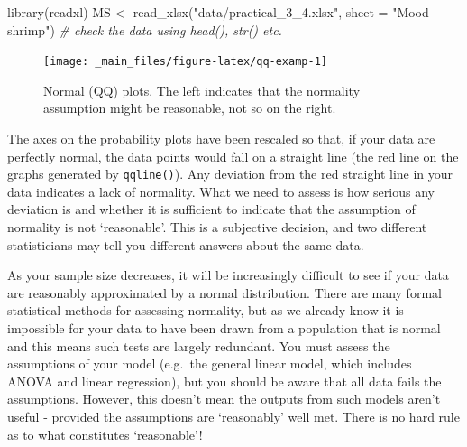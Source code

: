 \documentclass[
  11pt,
  a4paper,
]{book}
\newenvironment{Shaded}{\begin{snugshade}}{\end{snugshade}}
\newcommand{\AttributeTok}[1]{\textcolor[rgb]{0.77,0.63,0.00}{#1}}
\newcommand{\CommentTok}[1]{\textcolor[rgb]{0.56,0.35,0.01}{\textit{#1}}}
\newcommand{\DecValTok}[1]{\textcolor[rgb]{0.00,0.00,0.81}{#1}}
\newcommand{\FunctionTok}[1]{\textcolor[rgb]{0.00,0.00,0.00}{#1}}
\newcommand{\NormalTok}[1]{#1}
\newcommand{\OtherTok}[1]{\textcolor[rgb]{0.56,0.35,0.01}{#1}}
\newcommand{\SpecialCharTok}[1]{\textcolor[rgb]{0.00,0.00,0.00}{#1}}
\newcommand{\StringTok}[1]{\textcolor[rgb]{0.31,0.60,0.02}{#1}}
\begin{document}
\begin{Shaded}
\begin{Highlighting}[]
\FunctionTok{library}\NormalTok{(readxl) }
\NormalTok{MS }\OtherTok{\textless{}{-}} \FunctionTok{read\_xlsx}\NormalTok{(}\StringTok{"data/practical\_3\_4.xlsx"}\NormalTok{, }\AttributeTok{sheet =} \StringTok{"Mood shrimp"}\NormalTok{)}
\CommentTok{\# check the data using head(), str() etc.}
\end{Highlighting}
\end{Shaded}

\begin{Shaded}
\end{Shaded}

\begin{figure}

{\centering \texttt{[image: \_main\_files/figure-latex/qq-examp-1]} 

}

\caption{Normal (QQ) plots. The left indicates that the normality assumption might be reasonable, not so on the right.}\label{fig:qq-examp}
\end{figure}

The axes on the probability plots have been rescaled so that, if your data are perfectly normal, the data points would fall on a straight line (the red line on the graphs generated by \texttt{qqline()}). Any deviation from the red straight line in your data indicates a lack of normality. What we need to assess is how serious any deviation is and whether it is sufficient to indicate that the assumption of normality is not `reasonable'. This is a subjective decision, and two different statisticians may tell you different answers about the same data.

As your sample size decreases, it will be increasingly difficult to see if your data are reasonably approximated by a normal distribution. There are many formal statistical methods for assessing normality, but as we already know it is impossible for your data to have been drawn from a population that is normal and this means such tests are largely redundant. You must assess the assumptions of your model (e.g.~the general linear model, which includes ANOVA and linear regression), but you should be aware that all data fails the assumptions. However, this doesn't mean the outputs from such models aren't useful - provided the assumptions are `reasonably' well met. There is no hard rule as to what constitutes `reasonable'!
\end{document}
